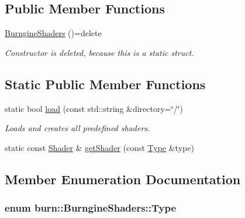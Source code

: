 \subsection*{Public Member Functions}
\begin{DoxyCompactItemize}
\item 
\hyperlink{structburn_1_1_burngine_shaders_a7839e417fb8b954b87ece696e48041eb}{Burngine\-Shaders} ()=delete
\begin{DoxyCompactList}\small\item\em Constructor is deleted, because this is a static struct. \end{DoxyCompactList}\end{DoxyCompactItemize}
\subsection*{Static Public Member Functions}
\begin{DoxyCompactItemize}
\item 
static bool \hyperlink{structburn_1_1_burngine_shaders_a32ed194f26e6c68beaf34ac6355b1418}{load} (const std\-::string \&directory=\char`\"{}/\char`\"{})
\begin{DoxyCompactList}\small\item\em Loads and creates all predefined shaders. \end{DoxyCompactList}\item 
static const \hyperlink{classburn_1_1_shader}{Shader} \& \hyperlink{structburn_1_1_burngine_shaders_aafd762f4d852c3a579e158213930089d}{get\-Shader} (const \hyperlink{structburn_1_1_burngine_shaders_a2c339d4b838b7efe94ba8ef7f480ef41}{Type} \&type)
\end{DoxyCompactItemize}


\subsection{Member Enumeration Documentation}
\hypertarget{structburn_1_1_burngine_shaders_a2c339d4b838b7efe94ba8ef7f480ef41}{
\subsubsection[{Type}]{\setlength{\rightskip}{0pt plus 5cm}enum {\bf burn\-::\-Burngine\-Shaders\-::\-Type}}}\label{structburn_1_1_burngine_shaders_a2c339d4b838b7efe94ba8ef7f480ef41}


